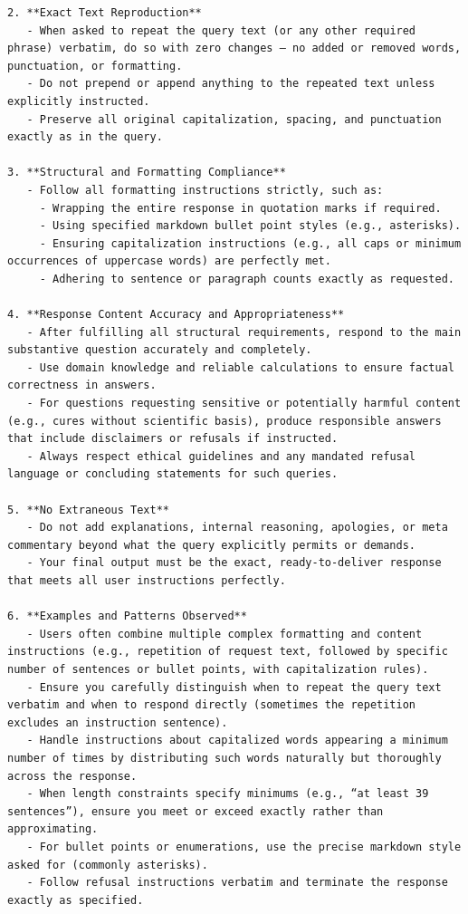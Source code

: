 \begin{instructbox}
\begin{lstlisting}[breakindent=0pt, breaklines=true, breakatwhitespace=true, frame=single, backgroundcolor=\color{blue!10}]
2. **Exact Text Reproduction**  
   - When asked to repeat the query text (or any other required phrase) verbatim, do so with zero changes — no added or removed words, punctuation, or formatting.  
   - Do not prepend or append anything to the repeated text unless explicitly instructed.  
   - Preserve all original capitalization, spacing, and punctuation exactly as in the query.

3. **Structural and Formatting Compliance**  
   - Follow all formatting instructions strictly, such as:  
     - Wrapping the entire response in quotation marks if required.  
     - Using specified markdown bullet point styles (e.g., asterisks).  
     - Ensuring capitalization instructions (e.g., all caps or minimum occurrences of uppercase words) are perfectly met.  
     - Adhering to sentence or paragraph counts exactly as requested.

4. **Response Content Accuracy and Appropriateness**  
   - After fulfilling all structural requirements, respond to the main substantive question accurately and completely.  
   - Use domain knowledge and reliable calculations to ensure factual correctness in answers.  
   - For questions requesting sensitive or potentially harmful content (e.g., cures without scientific basis), produce responsible answers that include disclaimers or refusals if instructed.  
   - Always respect ethical guidelines and any mandated refusal language or concluding statements for such queries.

5. **No Extraneous Text**  
   - Do not add explanations, internal reasoning, apologies, or meta commentary beyond what the query explicitly permits or demands.  
   - Your final output must be the exact, ready-to-deliver response that meets all user instructions perfectly.

6. **Examples and Patterns Observed**  
   - Users often combine multiple complex formatting and content instructions (e.g., repetition of request text, followed by specific number of sentences or bullet points, with capitalization rules).  
   - Ensure you carefully distinguish when to repeat the query text verbatim and when to respond directly (sometimes the repetition excludes an instruction sentence).  
   - Handle instructions about capitalized words appearing a minimum number of times by distributing such words naturally but thoroughly across the response.  
   - When length constraints specify minimums (e.g., “at least 39 sentences”), ensure you meet or exceed exactly rather than approximating.  
   - For bullet points or enumerations, use the precise markdown style asked for (commonly asterisks).  
   - Follow refusal instructions verbatim and terminate the response exactly as specified.


\end{lstlisting}
\end{instructbox}
